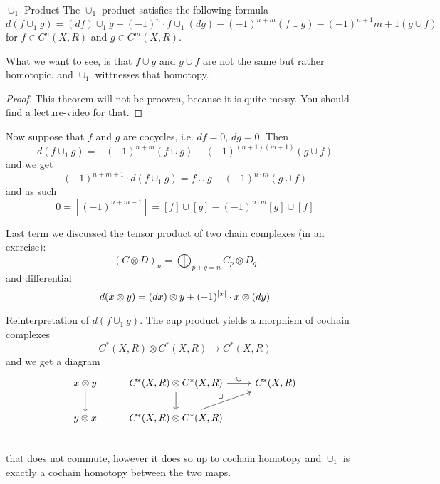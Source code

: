 \documentclass[language=english]{TemplateLecture}
\begin{document}
\begin{thm}{\(\cup_1\)-Product}{}
    The \(\cup_1\)-product satisfies the following formula
    \[d(f\cup_1 g) = (df) \cup_1 g + (-1)^n \cdot f \cup_1 (dg) - (-1)^{n+m}(f\cup g) - (-1)^{n+1}{m+1}(g\cup f)\]
    for \(f \in C^n(X,R)\) and \(g \in C^m(X,R)\).
\end{thm}

\begin{remark}
    What we want to see, is that \(f\cup g\) and \(g\cup f\) are not the same but rather homotopic, and \(\cup_1\) wittnesses that homotopy.
\end{remark}

\begin{proof}
    This theorem will not be prooven, because it is quite messy. You should find a lecture-video for that.
\end{proof}

Now suppose that \(f\) and \(g\) are cocycles, i.e. \(df = 0\), \(dg = 0\). Then
\[d(f\cup_1 g) = -(-1)^{n+m}(f\cup g) - (-1)^{(n+1)(m+1)}(g\cup f) \]
and we get
\[(-1)^{n+m+1}\cdot d(f\cup_1 g) = f\cup g - (-1)^{n \cdot m} (g\cup f)\] and as such
\[0 = [(-1)^{n+m-1}] = [f] \cup [g] - (-1)^{n\cdot m} [g] \cup [f]\]

\begin{remark}
    Last term we discussed the tensor product of two chain complexes (in an exercise):
    \[(C\otimes D)_n = \bigoplus_{p+q = n} C_p \otimes D_q\]
    and differential
    \[d(x\otimes y) = (dx) \otimes y + (-1)^{\lvert x\rvert} \cdot x \otimes (dy)\]
\end{remark}

\begin{remark}
    Reinterpretation of \(d(f \cup_1 g)\).
    The cup product yields a morphism of cochain complexes
    \[C^*(X,R) \otimes C^*(X,R) \to C^*(X,R)\]
    and we get a diagram
    \[\begin{tikzcd}
        x \otimes y \ar[d] & C^*(X,R) \otimes C^*(X,R) \ar[r, "\cup"] \ar[d] & C^*(X,R) \\
        y \otimes x & C^*(X,R) \otimes C^*(X,R) \ar[ru, "\cup"] & \\
    \end{tikzcd}\]
    that does not commute, however it does so up to cochain homotopy and \(\cup_1\) is exactly a cochain homotopy between the two maps.
\end{remark}
\end{document}
